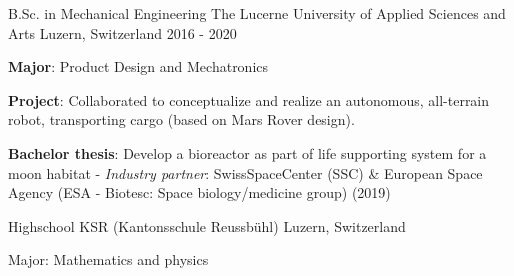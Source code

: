 

\begin{cventries}

\cventry
{B.Sc. in Mechanical Engineering} %
{The Lucerne University of Applied Sciences and Arts} %
{Luzern, Switzerland} %
{2016 - 2020} %
{
	\begin{cvitems} %
		\item {\textbf{Major}: Product Design and Mechatronics}
		\item {\textbf{Project}: Collaborated to conceptualize and realize an autonomous, all-terrain robot, transporting cargo (based on Mars Rover design).}
		\item {\textbf{Bachelor thesis}: Develop a bioreactor as part of life supporting system for a moon habitat - \newline \textit{Industry partner}: \mbox{SwissSpaceCenter} (SSC) \& European Space Agency (ESA - Biotesc: Space biology/medicine group) (2019)}
	\end{cvitems}
}



  \cventry
    {Highschool} %
    {KSR (Kantonsschule Reussbühl)} %
    {Luzern, Switzerland} %
    {} %
    {
      \begin{cvitems} %
        \item {Major: Mathematics and physics}
      \end{cvitems}
    }

\end{cventries}
